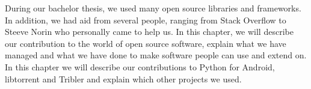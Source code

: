 During our bachelor thesis, we used many open source libraries and frameworks. In addition, we had aid from several people, ranging from Stack Overflow to Steeve Norin who personally came to help us. In this chapter, we will describe our contribution to the world of open source software, explain what we have managed and what we have done to make software people can use and extend on. In this chapter we will describe our contributions to Python for Android, libtorrent and Tribler and explain which other projects we used.